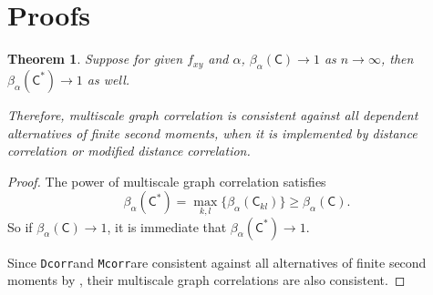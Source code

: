 \documentclass[11pt]{article}
\providecommand{\sct}[1]{{\sc \texttt{#1}}}
\newcommand{\G}{\mathsf{C}}
\newcommand{\Dcorr}{\sct{Dcorr}}
\newcommand{\Mcorr}{\sct{Mcorr}}
\newtheorem{appThm}{Theorem}
\begin{document}
\section{Proofs}
\label{appen:proofs}
\begin{appThm}
Suppose for given $f_{xy}$ and $\alpha$, $\beta_{\alpha}(\G) \rightarrow 1$ as $n \rightarrow \infty$, then $\beta_{\alpha}(\G^{*}) \rightarrow 1$ as well.

Therefore, multiscale graph correlation is consistent against all dependent alternatives of finite second moments, when it is implemented by distance correlation or modified distance correlation.
\end{appThm}
\begin{proof}
The power of multiscale graph correlation satisfies
\begin{equation}
\beta_{\alpha}(\G^{*})=\max_{k,l}\{\beta_{\alpha}(\G_{kl})\} \geq \beta_{\alpha}(\G).
\end{equation}
So if $\beta_{\alpha}(\G) \rightarrow 1$, it is immediate that $\beta_{\alpha}(\G^{*}) \rightarrow 1$.

Since \Dcorr and \Mcorr are consistent against all alternatives of finite second moments by \cite{SzekelyRizzoBakirov2007, SzekelyRizzo2013a}, their multiscale graph correlations are also consistent.
\end{proof}
\end{document}
